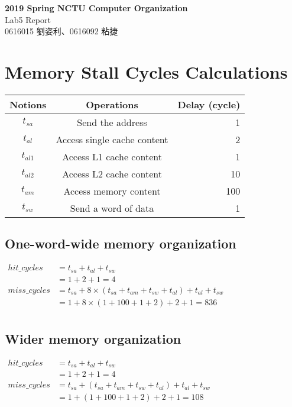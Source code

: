 \documentclass[12pt, a4paper]{article}
\title{
    \textbf{2019 Spring NCTU Computer Organization} \\
    \large Lab5 Report \\
    \small Tracy Liu, Chieh Nien
    \author Tracy Liu, Chieh Nien
    \date{}
}
\begin{document}
    \begin{CJK*}{UTF8}{bsmi}
    \begin{center}
        \LARGE\textbf{2019 Spring NCTU Computer Organization} \\
        \large Lab5 Report \\
        \small 0616015 劉姿利、0616092 粘捷 \\
    \end{center}
    \section{Memory Stall Cycles Calculations}
        \begin{center}
            \begin{tabular}{ccr}
            \hline
                Notions & Operations & Delay (cycle) \\
            \hline
                $t_{sa}$ & Send the address & 1 \\
                $t_{al}$ & Access single cache content & 2 \\
                $t_{al1}$ & Access L1 cache content & 1 \\
                $t_{al2}$ & Access L2 cache content & 10 \\
                $t_{am}$ & Access memory content & 100 \\
                $t_{sw}$ & Send a word of data & 1 \\
            \hline
            \end{tabular}
        \end{center}
        \subsection{One-word-wide memory organization}
            $
            \begin{aligned}
            hit\_cycles  & = t_{sa} + t_{al} + t_{sw} \\
                         & = 1 + 2 + 1 = 4 \\
            miss\_cycles & = t_{sa} + 8 \times (t_{sa} + t_{am} + t_{sw} + t_{al}) + t_{al} + t_{sw} \\
                         & = 1 + 8 \times (1 + 100 + 1 + 2) + 2 + 1 = 836 \\
            \end{aligned}
            $
        \subsection{Wider memory organization}
            $
            \begin{aligned}
            hit\_cycles & = t_{sa} + t_{al} + t_{sw} \\
                       & = 1 + 2 + 1 = 4 \\
            miss\_cycles & = t_{sa} + (t_{sa} + t_{am} + t_{sw} + t_{al}) + t_{al} + t_{sw} \\
                        & = 1 + (1 + 100 + 1 + 2) + 2 + 1 = 108 \\
            \end{aligned}
            $

\end{CJK*}
\end{document}
